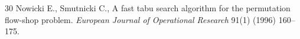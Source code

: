 \begin{thebibliography}{30}
Nowicki E., Smutnicki C., A fast tabu search algorithm for the permutation flow-shop problem. \emph{European Journal of Operational Research} 91(1) (1996) 160--175.










\end{thebibliography}
